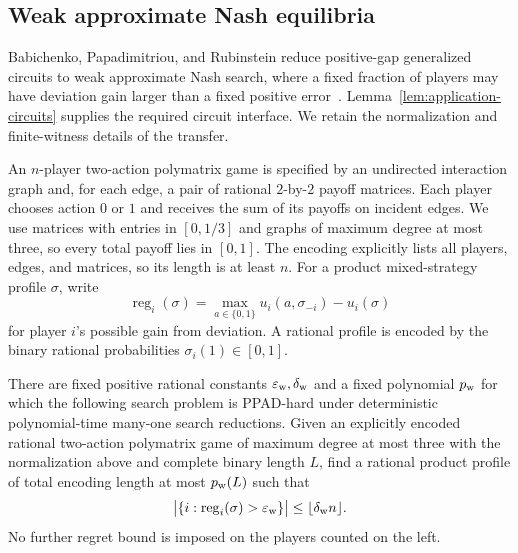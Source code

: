 \subsection{Weak approximate Nash equilibria}

Babichenko, Papadimitriou, and Rubinstein reduce positive-gap generalized
circuits to weak approximate Nash search, where a fixed fraction of
players may have deviation gain larger than a fixed positive
error~\cite[Definition~4 and Theorem~2]{BPR2016}.
Lemma~\ref{lem:application-circuits} supplies the required circuit
interface. We retain the normalization and finite-witness details of the
transfer.

An $n$-player two-action polymatrix game is specified by an undirected
interaction graph and, for each edge, a pair of rational $2$-by-$2$
payoff matrices. Each player chooses action $0$ or $1$ and receives the
sum of its payoffs on incident edges. We use matrices with entries in
$[0,1/3]$ and graphs of maximum degree at most three, so every total
payoff lies in $[0,1]$. The encoding explicitly lists all players,
edges, and matrices, so its length is at least $n$. For a product
mixed-strategy profile $\sigma$,
write
\[
 \operatorname{reg}_i(\sigma)
 =\max_{a\in\{0,1\}}u_i(a,\sigma_{-i})-u_i(\sigma)
\]
for player $i$'s possible gain from deviation. A rational profile is
encoded by the binary rational probabilities $\sigma_i(1)\in[0,1]$.

\begin{corollary}
\label{cor:weak-nash}
There are fixed positive rational constants $\varepsilon_{\rm w},\delta_{\rm w}$
and a fixed polynomial $p_{\rm w}$ for which the following search problem
is PPAD-hard under deterministic polynomial-time many-one search
reductions. Given an explicitly encoded rational two-action polymatrix
game of maximum degree at most three with the normalization above and
complete binary length $L$, find a rational product profile of total
encoding length at most $p_{\rm w}(L)$ such that
\begin{equation}\label{eq:weak-nash}
 \bigl|\{i:\operatorname{reg}_i(\sigma)>\varepsilon_{\rm w}\}\bigr|
 \leq \lfloor\delta_{\rm w}n\rfloor .
\end{equation}
No further regret bound is imposed on the players counted on the left.
\end{corollary}

